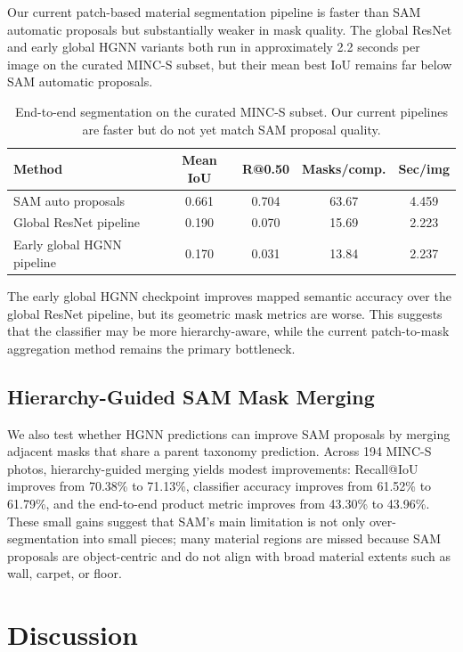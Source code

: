 \documentclass[11pt,twocolumn,letterpaper]{article}
\begin{document}
Our current patch-based material segmentation pipeline is faster than SAM automatic proposals but substantially weaker in mask quality. The global ResNet and early global HGNN variants both run in approximately 2.2 seconds per image on the curated MINC-S subset, but their mean best IoU remains far below SAM automatic proposals.

\begin{table}[t]
\centering
\small
\begin{tabular}{lcccc}
\toprule
Method & Mean IoU & R@0.50 & Masks/comp. & Sec/img \\
\midrule
SAM auto proposals & 0.661 & 0.704 & 63.67 & 4.459 \\
Global ResNet pipeline & 0.190 & 0.070 & 15.69 & 2.223 \\
Early global HGNN pipeline & 0.170 & 0.031 & 13.84 & 2.237 \\
\bottomrule
\end{tabular}
\caption{End-to-end segmentation on the curated MINC-S subset. Our current pipelines are faster but do not yet match SAM proposal quality.}
\label{tab:segmentation_results}
\end{table}

The early global HGNN checkpoint improves mapped semantic accuracy over the global ResNet pipeline, but its geometric mask metrics are worse. This suggests that the classifier may be more hierarchy-aware, while the current patch-to-mask aggregation method remains the primary bottleneck.

\subsection{Hierarchy-Guided SAM Mask Merging}

We also test whether HGNN predictions can improve SAM proposals by merging adjacent masks that share a parent taxonomy prediction. Across 194 MINC-S photos, hierarchy-guided merging yields modest improvements: Recall@IoU improves from 70.38\% to 71.13\%, classifier accuracy improves from 61.52\% to 61.79\%, and the end-to-end product metric improves from 43.30\% to 43.96\%. These small gains suggest that SAM's main limitation is not only over-segmentation into small pieces; many material regions are missed because SAM proposals are object-centric and do not align with broad material extents such as wall, carpet, or floor.

\section{Discussion}
\end{document}
